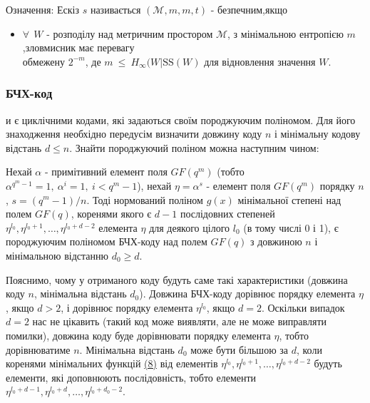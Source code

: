 \documentclass[11pt]{article}
\providecommand{\tightlist}{%
      \setlength{\itemsep}{0pt}\setlength{\parskip}{0pt}}
\begin{document}
Означення: Ескіз \(s\) називається
\((\mathcal{M},m,\overset{\text{~}}{m},t)\) - безпечним,якщо

\begin{itemize}
\tightlist
\item
  \(\forall ~~ W\) - розподілу над метричним простором \(\mathcal{M}\),
  з мінімальною ентропією \(m\),зловмисник має перевагу\\
  обмежену \(2^{-\overset{\text{~}}{m}}\), де
  \(\overset{\text{~}}{m}~\leq~\overset{\text{~}}{H}_{\infty}(W| \text{SS}(W)\)
  для відновлення значення \(W\).
\end{itemize}

    \hypertarget{ux431ux447ux445-ux43aux43eux434}{%
\subsubsection{БЧХ-код}\label{ux431ux447ux445-ux43aux43eux434}}

и є циклічними кодами, які задаються своїм породжуючим поліномом. Для
його знаходження необхідно передусім визначити довжину коду
\({\displaystyle n}\) і мінімальну кодову відстань
\({\displaystyle d\leqslant n}\). Знайти породжуючий поліном можна
наступним чином:

Нехай \({\displaystyle \alpha }\) - примітивний елемент поля
\({\displaystyle GF(q^{m})}\) (тобто
\({\displaystyle \alpha ^{q^{m}-1}=1,\ \alpha ^{i} = 1,\ i<q^{m}-1}\)),
нехай \({\displaystyle \eta =\alpha ^{s}}\) - елемент поля
\({\displaystyle GF(q^{m})}\) порядку \({\displaystyle n}\),
\({\displaystyle s=(q^{m}-1)/n}\). Тоді нормований поліном
\({\displaystyle g(x)}\) мінімальної степені над полем
\({\displaystyle GF(q)}\), коренями якого є \({\displaystyle d-1}\)
послідовних степеней
\({\displaystyle \eta ^{l_{0}},\eta ^{l_{0}+1},\ldots ,\eta ^{l_{0}+d-2}}\)
елемента \({\displaystyle \eta }\) для деякого цілого
\({\displaystyle l_{0}}\) (в тому числі 0 і 1), є породжуючим поліномом
БЧХ-коду над полем \({\displaystyle GF(q)}\) з довжиною
\({\displaystyle n}\) і мінімальною відстанню
\({\displaystyle d_{0}\geqslant d}\).

Пояснимо, чому у отриманого коду будуть саме такі характеристики
(довжина коду \({\displaystyle n}\), мінімальна відстань
\({\displaystyle d_{0}}\)). Довжина БЧХ-коду дорівнює порядку елемента
\({\displaystyle \eta }\), якщо \({\displaystyle d>2}\), і дорівнює
порядку елемента \({\displaystyle \eta ^{l_{0}}}\), якщо
\({\displaystyle d=2}\). Оскільки випадок \({\displaystyle d=2}\) нас не
цікавить (такий код може виявляти, але не може виправляти помилки),
довжина коду буде дорівнювати порядку елемента
\({\displaystyle \eta }\), тобто дорівнюватиме \({\displaystyle n}\).
Мінімальна відстань \({\displaystyle d_{0}}\) може бути більшою за
\({\displaystyle d}\), коли коренями мінімальних функцій
\hyperref[література]{(8)} від елементів
\({\displaystyle \eta ^{l_{0}},\eta ^{l_{0}+1},\ldots ,\eta ^{l_{0}+d-2}}\)
будуть елементи, які доповнюють послідовність, тобто елементи
\({\displaystyle \eta ^{l_{0}+d-1},\eta ^{l_{0}+d},\ldots ,\eta ^{l_{0}+d_{0}-2}}\).
\end{document}
